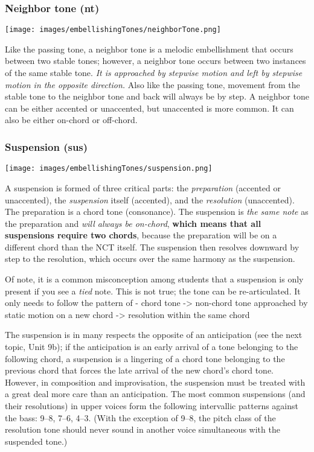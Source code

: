 \documentclass{book}
\begin{document}
\hypertarget{neighbor-tone-nt}{%
\subsubsection{Neighbor tone (nt)}\label{neighbor-tone-nt}}

\texttt{[image: images/embellishingTones/neighborTone.png]}

Like the passing tone, a neighbor tone is a melodic embellishment that occurs
between two stable tones; however, a neighbor tone occurs between two
instances of the same stable tone. \emph{It is approached by stepwise motion
and left by stepwise motion in the opposite direction.} Also like the passing
tone, movement from the stable tone to the neighbor tone and back will always
be by step. A neighbor tone can be either accented or unaccented, but
unaccented is more common. It can also be either on-chord or off-chord.

\hypertarget{suspension-sus}{%
\subsubsection{Suspension (sus)}\label{suspension-sus}}

\texttt{[image: images/embellishingTones/suspension.png]}

A suspension is formed of three critical parts: the \emph{preparation}
(accented or unaccented), the \emph{suspension} itself (accented), and the
\emph{resolution} (unaccented). The preparation is a chord tone (consonance).
The suspension is \emph{the same note} as the preparation and \emph{will
always be on-chord}, \textbf{which means that all suspensions require two
chords}, because the preparation will be on a different chord than the NCT
itself. The suspension then resolves downward by step to the resolution, which
occurs over the same harmony as the suspension.

Of note, it is a common misconception among students that a suspension is only
present if you see a \emph{tied} note. This is not true; the tone can be
re-articulated. It only needs to follow the pattern of - chord tone
-\textgreater{} non-chord tone approached by static motion on a new chord
-\textgreater{} resolution within the same chord

The suspension is in many respects the opposite of an anticipation (see the
next topic, Unit 9b); if the anticipation is an early arrival of a tone
belonging to the following chord, a suspension is a lingering of a chord tone
belonging to the previous chord that forces the late arrival of the new
chord's chord tone. However, in composition and improvisation, the suspension
must be treated with a great deal more care than an anticipation. The most
common suspensions (and their resolutions) in upper voices form the following
intervallic patterns against the bass: 9--8, 7--6, 4--3. (With the exception
of 9--8, the pitch class of the resolution tone should never sound in another
voice simultaneous with the suspended tone.)
\end{document}
